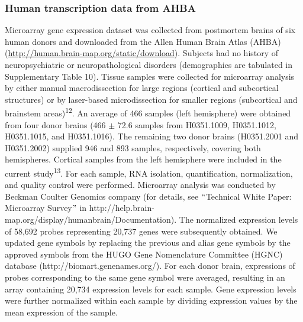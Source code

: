 \begin{refsection}
\subsubsection*{Human transcription data from AHBA}
Microarray gene expression dataset was collected from postmortem brains of six human donors and downloaded from the Allen Human Brain Atlas (AHBA) (\url{http://human.brain-map.org/static/download}). Subjects had no history of neuropsychiatric or neuropathological disorders (demographics are tabulated in Supplementary Table 10). Tissue samples were collected for microarray analysis by either manual macrodissection for large regions (cortical and subcortical structures) or by laser-based microdissection for smaller regions (subcortical and brainstem areas)\textsuperscript{12}. An average of 466 samples (left hemisphere) were obtained from four donor brains (466 $ \pm $  72.6 samples from H0351.1009, H0351.1012, H0351.1015, and H0351.1016). The remaining two donor brains (H0351.2001 and H0351.2002) supplied 946 and 893 samples, respectively, covering both hemispheres. Cortical samples from the left hemisphere were included in the current study\textsuperscript{13}. For each sample, RNA isolation, quantification, normalization, and quality control were performed. Microarray analysis was conducted by Beckman Coulter Genomics company (for details, see $``$Technical White Paper: Microarray Survey$"$  in http://help.brain-map.org/display/humanbrain/Documentation). The normalized expression levels of 58,692 probes representing 20,737 genes were subsequently obtained. We updated gene symbols by replacing the previous and alias gene symbols by the approved symbols from the HUGO Gene Nomenclature Committee (HGNC) database (http://biomart.genenames.org/). For each donor brain, expressions of probes corresponding to the same gene symbol were averaged, resulting in an array containing 20,734 expression levels for each sample. Gene expression levels were further normalized within each sample by dividing expression values by the mean expression of the sample.


\end{refsection}
